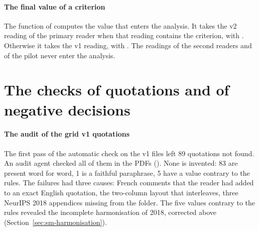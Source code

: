 \paragraph{The final value of a criterion}
The function  of  computes the value that enters the
analysis. It takes the v2 reading of the primary reader when that reading contains the criterion, with
. Otherwise it takes the v1 reading, with . The readings of
the second readers and of the pilot never enter the analysis.

\section{The checks of quotations and of negative decisions}\label{sec:sm-controles}

\paragraph{The audit of the grid v1 quotations}
The first pass of the automatic check on the v1 files left 89 quotations not found. An audit agent
checked all of them in the PDFs (). None is invented: 83 are present
word for word, 1 is a faithful paraphrase, 5 have a value contrary to the rules. The failures had three causes:
French comments that the reader had added to an exact English quotation, the two-column layout that
 interleaves, three NeurIPS 2018 appendices missing from the 
folder. The five values contrary to the rules revealed the incomplete harmonisation of 2018,
corrected above (Section~\ref{sec:sm-harmonisation}).

